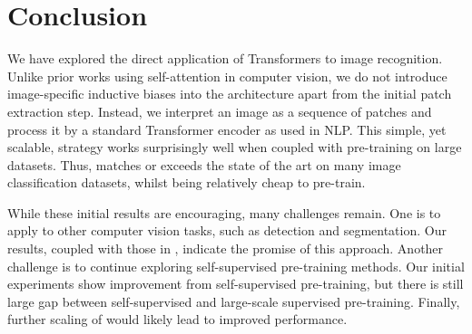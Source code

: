 \section{Conclusion}

We have explored the direct application of Transformers to image recognition.
Unlike prior works using self-attention in computer vision, we do not introduce image-specific inductive biases into the architecture apart from the initial patch extraction step.
Instead, we interpret an image as a sequence of patches and process it by a standard Transformer encoder as used in NLP.
This simple, yet scalable, strategy works surprisingly well when coupled with pre-training on large datasets.
Thus, \oursfull matches or exceeds the state of the art on many image classification datasets, whilst being relatively cheap to pre-train.

While these initial results are encouraging, many challenges remain.
One is to apply \oursabbrv to other computer vision tasks, such as detection and segmentation.
Our results, coupled with those in \citet{carion20-detr}, indicate the promise of this approach.
Another challenge is to continue exploring self-supervised pre-training methods.
Our initial experiments show improvement from self-supervised pre-training, but there is still large gap between self-supervised and large-scale supervised pre-training.
Finally, further scaling of \oursabbrv{} would likely lead to improved performance.